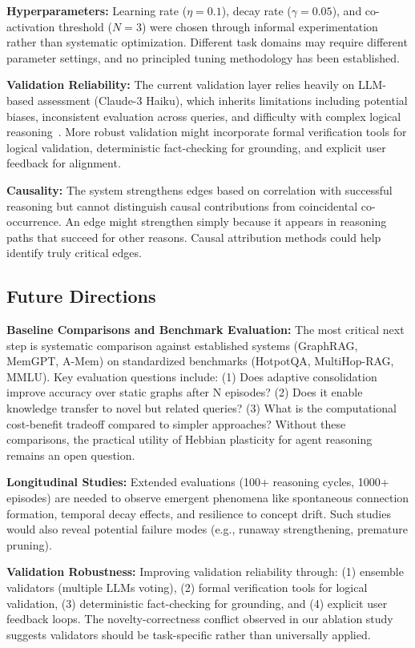 \documentclass{article}
\begin{document}
\textbf{Hyperparameters:} Learning rate ($\eta = 0.1$), decay rate ($\gamma = 0.05$), and co-activation threshold ($N = 3$) were chosen through informal experimentation rather than systematic optimization. Different task domains may require different parameter settings, and no principled tuning methodology has been established.

\textbf{Validation Reliability:} The current validation layer relies heavily on LLM-based assessment (Claude-3 Haiku), which inherits limitations including potential biases, inconsistent evaluation across queries, and difficulty with complex logical reasoning~\citep{pan2024unifying}. More robust validation might incorporate formal verification tools for logical validation, deterministic fact-checking for grounding, and explicit user feedback for alignment.

\textbf{Causality:} The system strengthens edges based on correlation with successful reasoning but cannot distinguish causal contributions from coincidental co-occurrence. An edge might strengthen simply because it appears in reasoning paths that succeed for other reasons. Causal attribution methods could help identify truly critical edges.

\subsection{Future Directions}

\textbf{Baseline Comparisons and Benchmark Evaluation:} The most critical next step is systematic comparison against established systems (GraphRAG, MemGPT, A-Mem) on standardized benchmarks (HotpotQA, MultiHop-RAG, MMLU). Key evaluation questions include: (1) Does adaptive consolidation improve accuracy over static graphs after N episodes? (2) Does it enable knowledge transfer to novel but related queries? (3) What is the computational cost-benefit tradeoff compared to simpler approaches? Without these comparisons, the practical utility of Hebbian plasticity for agent reasoning remains an open question.

\textbf{Longitudinal Studies:} Extended evaluations (100+ reasoning cycles, 1000+ episodes) are needed to observe emergent phenomena like spontaneous connection formation, temporal decay effects, and resilience to concept drift. Such studies would also reveal potential failure modes (e.g., runaway strengthening, premature pruning).

\textbf{Validation Robustness:} Improving validation reliability through: (1) ensemble validators (multiple LLMs voting), (2) formal verification tools for logical validation, (3) deterministic fact-checking for grounding, and (4) explicit user feedback loops. The novelty-correctness conflict observed in our ablation study suggests validators should be task-specific rather than universally applied.
\end{document}
